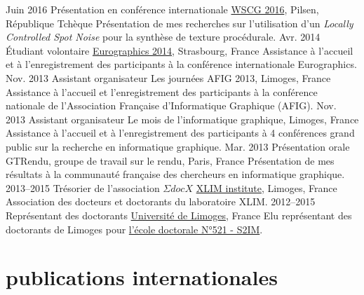 \documentclass[]{friggeri-cv-a4} %
\begin{document}
\begin{entrylist}
\entry
{Juin 2016}
{Présentation en conférence internationale}
{\href{https://www.wscg.cz/}{WSCG 2016}, Pilsen, République Tchèque}
{ Présentation de mes recherches sur l'utilisation d'un \textit{Locally Controlled Spot Noise}  pour la synthèse de texture procédurale.}
\entry
{Avr. 2014}
{Étudiant volontaire}
{\href{http://eg2014.unistra.fr/}{Eurographics 2014}, Strasbourg, France}
{Assistance à l'accueil et à l'enregistrement des participants à la conférence internationale Eurographics.}
\entry
{Nov. 2013}
{Assistant organisateur}
{Les journées AFIG 2013, Limoges, France}
{Assistance à l'accueil et l'enregistrement des participants à la conférence nationale de l'Association Française d'Informatique Graphique (AFIG).}
\entry
{Nov. 2013}
{Assistant organisateur}
{Le mois de l'informatique graphique, Limoges, France}
{Assistance à l'accueil et à l'enregistrement des participants à 4 conférences grand public sur la recherche en informatique graphique.}
\entry
{Mar. 2013}
{Présentation orale}
{GTRendu, groupe de travail sur le rendu, Paris, France}
{ Présentation de mes résultats à la communauté française des chercheurs en informatique graphique.}
\entry
{2013--2015}
{Trésorier de l'association $\Sigma doc X$}
{\href{http://www.xlim.fr/}{XLIM institute}, Limoges, France}
{Association des docteurs et doctorants du laboratoire XLIM.}
\entry
{2012--2015}
{Représentant des doctorants}
{\href{http://www.unilim.fr/}{Université de Limoges}, France}
{Elu représentant des doctorants de Limoges pour \href{http://s2i.ed.univ-poitiers.fr/}{l'école doctorale N°521 - S2IM}.}
\end{entrylist}


\section{publications internationales}
\end{document}
